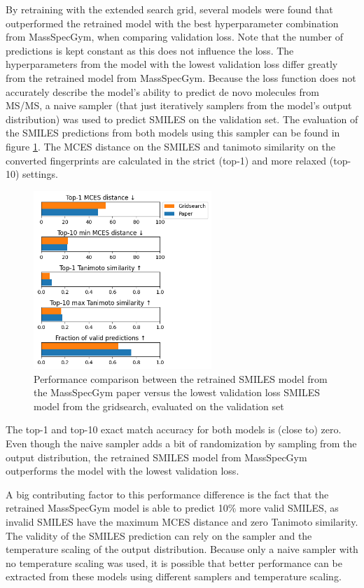 By retraining with the extended search grid, several models were found that outperformed the retrained model with the best hyperparameter combination from MassSpecGym, when comparing validation loss.
Note that the number of predictions is kept constant as this does not influence the loss.
The hyperparameters from the model with the lowest validation loss differ greatly from the retrained model from MassSpecGym. %
Because the loss function does not accurately describe the model's ability to predict de novo molecules from \ac{MS/MS},
a naive sampler (that just iteratively samplers from the model's output distribution) was used to predict SMILES on the validation set.
The evaluation of the SMILES predictions from both models using this sampler can be found in figure \ref{fig:gridsearch_vs_paper}.
The MCES distance on the SMILES and tanimoto similarity on the converted fingerprints are calculated in the strict (top-1) and more relaxed (top-10) settings.

\begin{figure}[h]
    \centering
    \includegraphics[width=0.6\textwidth]{figures/results/gridsearch_vs_paper.png}
    \caption{Performance comparison between the retrained SMILES model from the MassSpecGym paper versus the lowest validation loss SMILES model from the gridsearch, evaluated on the validation set}
    \label{fig:gridsearch_vs_paper}
\end{figure}

The top-1 and top-10 exact match accuracy for both models is (close to) zero.
Even though the naive sampler adds a bit of randomization by sampling from the output distribution, the retrained SMILES model from MassSpecGym outperforms the model with the lowest validation loss.

A big contributing factor to this performance difference is the fact that the retrained MassSpecGym model is able to predict 10\% more valid SMILES, as invalid SMILES have the maximum MCES distance and zero Tanimoto similarity.
The validity of the SMILES prediction can rely on the sampler and the temperature scaling of the output distribution.
Because only a naive sampler with no temperature scaling was used, it is possible that better performance can be extracted from these models using different samplers and temperature scaling.


